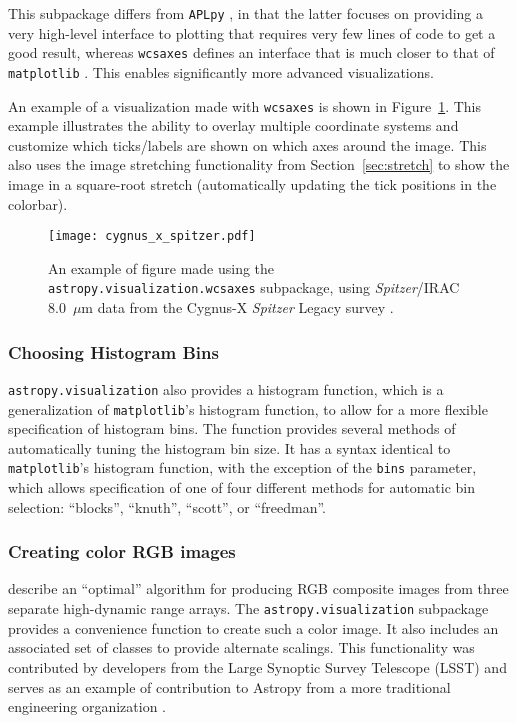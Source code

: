 \documentclass[modern]{aastex62}
\newcommand{\package}[1]{\texttt{#1}\xspace}
\newcommand{\astropy}{Astropy\xspace}
\newcommand{\sectionname}{Section\xspace}
\renewcommand{\figurename}{Figure\xspace}
\begin{document}
This subpackage differs from \package{APLpy} \citep{aplpy}, in that the latter
focuses on providing a very high-level interface to plotting that requires very
few lines of code to get a good result, whereas \package{wcsaxes} defines an
interface that is much closer to that of \package{matplotlib} \citep{matplotlib}.
This enables significantly more advanced visualizations.

An example of a visualization made with \package{wcsaxes} is shown in
\figurename~\ref{fig:wcsaxes}. This example illustrates the ability to
overlay multiple coordinate systems and customize which ticks/labels are shown
on which axes around the image. This also uses the image stretching
functionality from \sectionname~\ref{sec:stretch} to show the image in a
square-root stretch (automatically updating the tick positions in the colorbar).

\begin{figure}
\texttt{[image: cygnus\_x\_spitzer.pdf]}
\caption{%
An example of figure made using the \package{astropy.visualization.wcsaxes}
subpackage, using \textit{Spitzer}/IRAC 8.0~$\mu$m data from the Cygnus-X
\textit{Spitzer} Legacy survey \citep{cygnusx}.
\label{fig:wcsaxes}
}
\end{figure}

\subsubsection{Choosing Histogram Bins}

\package{astropy.visualization} also provides a histogram function, which is a
generalization of \texttt{matplotlib}’s histogram function, to allow for a more
flexible specification of histogram bins.  The function provides several methods
of automatically tuning the histogram bin size. It has a syntax identical to
\texttt{matplotlib}’s histogram function, with the exception of the \texttt{bins}
parameter, which allows specification of one of four different methods for
automatic bin selection: ``blocks'', ``knuth'', ``scott'', or ``freedman''.

\subsubsection{Creating color RGB images}

\cite{Lupton2004} describe an ``optimal'' algorithm for producing
RGB composite images from three separate high-dynamic range
arrays. The \package{astropy.visualization} subpackage provides a convenience
function to create such a color image.  It also includes an associated set of
classes to provide alternate scalings.
This functionality was contributed by developers from the Large Synoptic Survey
Telescope (LSST) and serves as an example of contribution to \astropy from a
more traditional engineering organization \citep{Jennes2016}.
\end{document}
